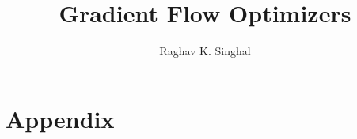 \documentclass[12pt,twoside]{article}
\date{}   %
\begin{document}
\title{Gradient Flow Optimizers}
\author{Raghav K. Singhal}
\maketitle







% 



\section{Appendix}




\end{document}
